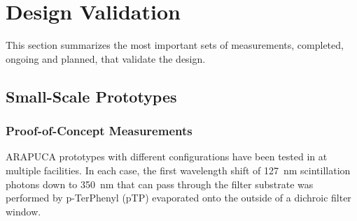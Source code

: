 \section{Design Validation}
\label{sec:fdsp-pd-validation}


This section summarizes the most important sets of measurements, completed, ongoing and planned, that validate the  design.


\subsection{Small-Scale  Prototypes}
\label{sec:sarapuca-prototypes}

\subsubsection{Proof-of-Concept Measurements}
\label{sec:proof-principle}

ARAPUCA prototypes with different configurations have been tested in \lar at multiple facilities. In each case, the first wavelength shift of \SI{127}{nm} scintillation photons down to \SI{350}{nm} that can pass through the filter substrate was performed by p-TerPhenyl (pTP) evaporated onto the outside of a dichroic filter window. 

